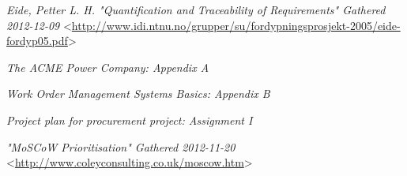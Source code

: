 \begin{thebibliography}{99}     
	

 \emph{Eide, Petter L. H. \textsl{"Quantiﬁcation and Traceability of Requirements"} Gathered 2012-12-09 } <\url{http://www.idi.ntnu.no/grupper/su/fordypningsprosjekt-2005/eide-fordyp05.pdf}>


 \emph{The ACME Power Company: Appendix A}

 \emph{Work Order Management Systems Basics: Appendix B}

 \emph{Project plan for procurement project: Assignment I}

 \emph{\textsl{"MoSCoW Prioritisation"} Gathered 2012-11-20} <\url{http://www.coleyconsulting.co.uk/moscow.htm}>

\end{thebibliography}